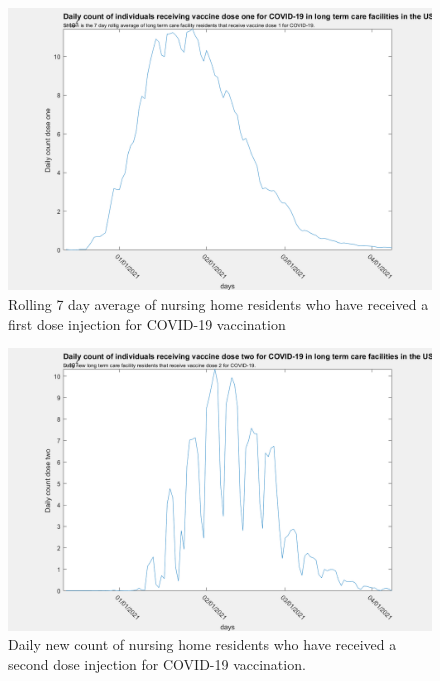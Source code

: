 \documentclass[twoside]{article}
\begin{document}
\begin{multicols}{2}
\begin{figure}[H]
	\includegraphics[width=\linewidth]{images/usa_daily_ltc_first_dose_processed.png}
	\caption{Rolling 7 day average of nursing home residents who have received a first dose injection for COVID-19 vaccination}
	\label{fig:images/usa_daily_ltc_first_dose_processedLabel}
\end{figure}

\begin{figure}[H]
	\includegraphics[width=\linewidth]{images/usa_daily_ltc_second_dose_unprocessed.png}
	\caption{Daily new count of nursing home residents who have received a second dose injection for COVID-19 vaccination.}
	\label{fig:images/usa_daily_ltc_second_dose_unprocessedLabel}
\end{figure}


\end{multicols}
\end{document}
